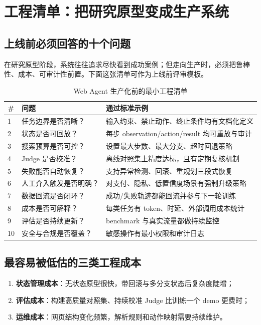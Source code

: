 \section{工程清单：把研究原型变成生产系统}

\subsection{上线前必须回答的十个问题}
在研究原型阶段，系统往往追求尽快看到成功案例；但走向生产时，必须把鲁棒性、成本、可审计性前置。下面这张清单可作为上线前评审模板。

\begin{table}[H]
\centering
\small
\begin{tabular}{p{0.8cm}p{3.9cm}p{5.8cm}}
\toprule
\textbf{\#} & \textbf{问题} & \textbf{通过标准示例} \\
\midrule
1 & 任务边界是否清晰？ & 输入约束、禁止动作、终止条件均有文档化定义 \\
2 & 状态是否可回放？ & 每步 observation/action/result 均可重放与审计 \\
3 & 搜索预算是否可控？ & 设置最大步数、最大分支、超时回退策略 \\
4 & Judge 是否校准？ & 离线对照集上精度达标，且有定期复核机制 \\
5 & 失败能否自动恢复？ & 支持异常检测、回滚、重规划三段式恢复 \\
6 & 人工介入触发是否明确？ & 对支付、隐私、低置信度场景有强制升级策略 \\
7 & 数据回流是否闭环？ & 成功/失败轨迹都能回流并参与下一轮训练 \\
8 & 成本是否可解释？ & 每类任务有 token、时延、外部调用成本统计 \\
9 & 评估是否持续更新？ & benchmark 与真实流量都做持续监控 \\
10 & 安全与合规是否覆盖？ & 敏感操作有最小权限和审计日志 \\
\bottomrule
\end{tabular}
\caption{Web Agent 生产化前的最小工程清单}
\end{table}

\subsection{最容易被低估的三类工程成本}
\begin{enumerate}
    \item \textbf{状态管理成本}：无状态原型很快，带回滚与多分支状态后复杂度陡增；
    \item \textbf{评估成本}：构建高质量对照集、持续校准 Judge 比训练一个 demo 更费时；
    \item \textbf{运维成本}：网页结构变化频繁，解析规则和动作映射需要持续维护。
\end{enumerate}

